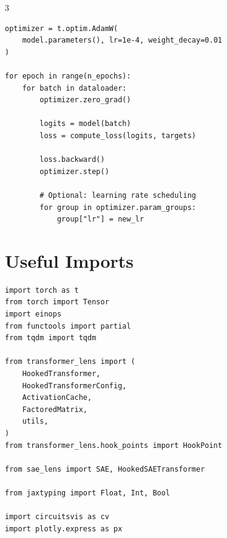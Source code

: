 \documentclass[10pt,a4paper,landscape]{article}
\begin{document}
\begin{multicols}{3}
\begin{lstlisting}
optimizer = t.optim.AdamW(
    model.parameters(), lr=1e-4, weight_decay=0.01
)

for epoch in range(n_epochs):
    for batch in dataloader:
        optimizer.zero_grad()

        logits = model(batch)
        loss = compute_loss(logits, targets)

        loss.backward()
        optimizer.step()

        # Optional: learning rate scheduling
        for group in optimizer.param_groups:
            group["lr"] = new_lr
\end{lstlisting}

\section{Useful Imports}

\begin{lstlisting}
import torch as t
from torch import Tensor
import einops
from functools import partial
from tqdm import tqdm

from transformer_lens import (
    HookedTransformer,
    HookedTransformerConfig,
    ActivationCache,
    FactoredMatrix,
    utils,
)
from transformer_lens.hook_points import HookPoint

from sae_lens import SAE, HookedSAETransformer

from jaxtyping import Float, Int, Bool

import circuitsvis as cv
import plotly.express as px
\end{lstlisting}

\end{multicols}
\end{document}

